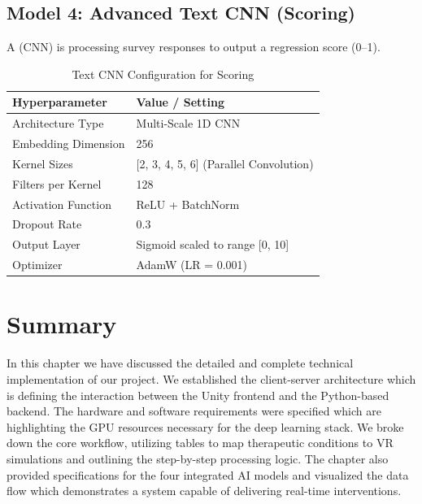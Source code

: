 \subsection{Model 4: Advanced Text CNN (Scoring)}
A (CNN) is processing survey responses to output a regression score (0--1).

\begin{table}[H]
\centering
\renewcommand{\arraystretch}{1.2}
\begin{tabular}{|l|l|}
\hline
\rowcolor{gray!15} \textbf{Hyperparameter} & \textbf{Value / Setting} \\ \hline
Architecture Type & Multi-Scale 1D CNN \\ \hline
Embedding Dimension & 256 \\ \hline
Kernel Sizes & [2, 3, 4, 5, 6] (Parallel Convolution) \\ \hline
Filters per Kernel & 128 \\ \hline
Activation Function & ReLU + BatchNorm \\ \hline
Dropout Rate & 0.3 \\ \hline
Output Layer & Sigmoid scaled to range [0, 10] \\ \hline
Optimizer & AdamW (LR = 0.001) \\ \hline
\end{tabular}
\caption{Text CNN Configuration for Scoring}
\label{tab:cnn_config}
\end{table}

\section{Summary}
In this chapter we have discussed the detailed and complete technical implementation of our project. We established the client-server architecture which is defining the interaction between the Unity frontend and the Python-based backend. The hardware and software requirements were specified which are highlighting the GPU resources necessary for the deep learning stack. We broke down the core workflow, utilizing tables to map therapeutic conditions to VR simulations and outlining the step-by-step processing logic. The chapter also provided specifications for the four integrated AI models and visualized the data flow which demonstrates a system capable of delivering real-time interventions.
